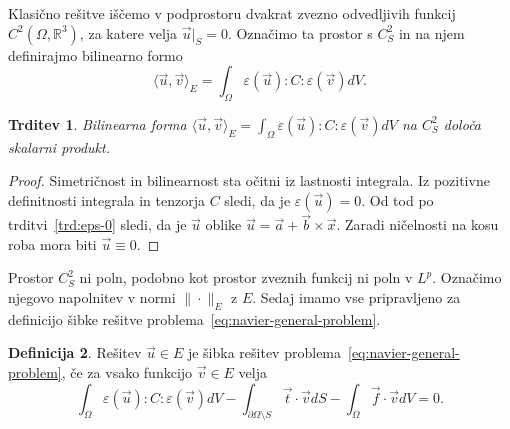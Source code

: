 \documentclass[12pt,a4paper,twoside]{article}
\theoremstyle{definition} %
\newtheorem{definicija}{Definicija}[section]
\theoremstyle{plain} %
\newtheorem{trditev}[definicija]{Trditev}
\numberwithin{equation}{section}
\newcommand{\R}{\mathbb R}
\newcommand{\eps}{\varepsilon}
\newcommand{\vv}{\vec{v}}
\newcommand{\vt}{\vec{t}}
\newcommand{\vu}{\vec{u}}
\newcommand{\va}{\vec{a}}
\newcommand{\vb}{\vec{b}}
\newcommand{\vf}{\vec{f}}
\newcommand{\vx}{\vec{x}}
\begin{document}
Klasično rešitve iščemo v podprostoru dvakrat zvezno odvedljivih funkcij
$C^2(\Omega, \R^3)$, za katere velja $\vu|_S = 0$. Označimo ta prostor s $C^2_S$
in na njem definirajmo bilinearno formo
\begin{equation}
   \langle \vu, \vv \rangle_E =  \int_{\Omega} \eps(\vu) : C : \eps(\vv) dV.
\end{equation}
\begin{trditev}
  Bilinearna forma $
  \langle \vu, \vv \rangle_E =  \int_{\Omega} \eps(\vu) : C : \eps(\vv) dV$ na
  $C^2_S$ določa skalarni produkt.
\end{trditev}
\begin{proof}
Simetričnost in bilinearnost sta očitni iz lastnosti integrala. Iz pozitivne
definitnosti integrala in tenzorja $C$ sledi, da je $\eps(\vu) = 0$. Od tod po
trditvi~\ref{trd:eps-0} sledi, da je $\vu$ oblike $\vu = \va + \vb \times \vx$.
Zaradi ničelnosti na kosu roba mora biti $\vu \equiv 0$.
\end{proof}
Prostor $C^2_S$ ni poln, podobno kot prostor zveznih funkcij ni poln v $L^p$.
Označimo njegovo napolnitev v normi $\|\cdot\|_E$ z $E$. Sedaj imamo vse
pripravljeno za definicijo šibke rešitve problema~\ref{eq:navier-general-problem}.

\begin{definicija}
  \label{def:sibka}
  Rešitev $\vu \in E$ je šibka rešitev problema~\ref{eq:navier-general-problem},
  če za vsako funkcijo $\vv \in E$ velja
  \begin{equation}
    \int_{\Omega}\eps(\vu) : C : \eps(\vv) dV - \int_{\partial \Omega\setminus S} \vt\cdot \vv dS
    -\int_{\Omega} \vf\cdot \vv dV = 0.
  \end{equation}
\end{definicija}
\end{document}
